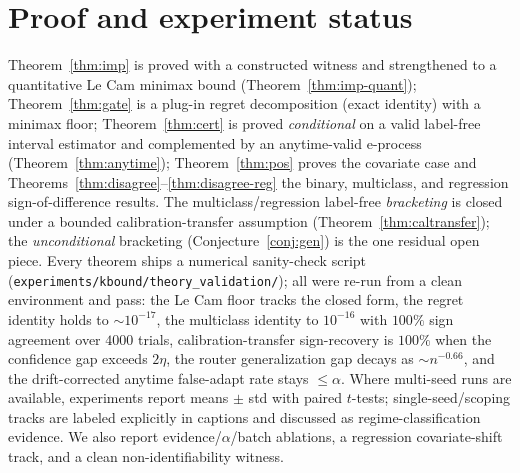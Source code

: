 \documentclass[11pt]{article}
\theoremstyle{plain}
\theoremstyle{definition}
\begin{document}
\section{Proof and experiment status}\label{app:status}
Theorem~\ref{thm:imp} is proved with a constructed witness and strengthened to a quantitative Le
Cam minimax bound (Theorem~\ref{thm:imp-quant}); Theorem~\ref{thm:gate} is a plug-in regret
decomposition (exact identity) with a minimax floor; Theorem~\ref{thm:cert} is proved
\emph{conditional} on a valid label-free interval estimator and complemented by an anytime-valid
e-process (Theorem~\ref{thm:anytime}); Theorem~\ref{thm:pos} proves the covariate case and
Theorems~\ref{thm:disagree}--\ref{thm:disagree-reg} the binary, multiclass, and regression
sign-of-difference results. The multiclass/regression label-free \emph{bracketing} is closed under
a bounded calibration-transfer assumption (Theorem~\ref{thm:caltransfer}); the \emph{unconditional}
bracketing (Conjecture~\ref{conj:gen}) is the one residual open piece. Every theorem ships a
numerical sanity-check script (\texttt{experiments/kbound/theory\_validation/}); all were re-run
from a clean environment and pass: the Le Cam floor tracks the closed form, the regret identity
holds to ${\sim}10^{-17}$, the multiclass identity to $10^{-16}$ with $100\%$ sign agreement over
$4000$ trials, calibration-transfer sign-recovery is $100\%$ when the confidence gap exceeds
$2\eta$, the router generalization gap decays as ${\sim}n^{-0.66}$, and the drift-corrected anytime
false-adapt rate stays $\le\alpha$. Where multi-seed runs are available, experiments report means
$\pm$ std with paired $t$-tests; single-seed/scoping tracks are labeled explicitly in captions and
discussed as regime-classification evidence. We also report evidence/$\alpha$/batch ablations, a
regression covariate-shift track, and a clean
non-identifiability witness.
\end{document}
